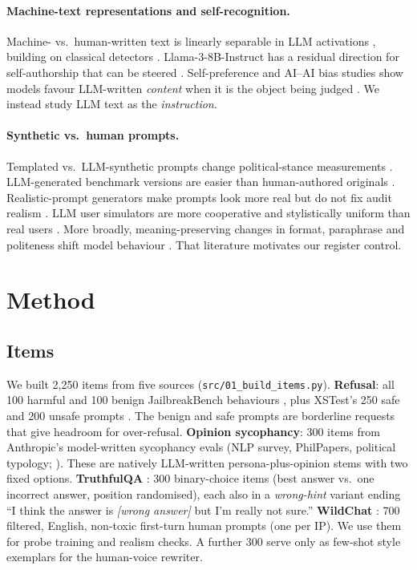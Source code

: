 \documentclass[10pt]{article}
\begin{document}
\paragraph{Machine-text representations and self-recognition.} Machine- vs.\ human-written text is linearly separable in LLM activations \citep{chen2025repreguard,quaremba2026linearprobing}, building on classical detectors \citep{mitchell2023detectgpt,verma2024ghostbuster}. Llama-3-8B-Instruct has a residual direction for self-authorship that can be steered \citep{ackerman2025selfrecognition}. Self-preference and AI--AI bias studies show models favour LLM-written \emph{content} when it is the object being judged \citep{panickssery2024selfrecognition,laurito2025aiaibias,xu2025selfpreferencing,tan2024blinded,germani2025sourceframing}. We instead study LLM text as the \emph{instruction}.

\paragraph{Synthetic vs.\ human prompts.} Templated vs.\ LLM-synthetic prompts change political-stance measurements \citep{chalkidis2026templated}. LLM-generated benchmark versions are easier than human-authored originals \citep{gill2025synthetic}. Realistic-prompt generators make prompts look more real but do not fix audit realism \citep{kissane2026realisticprompts}. LLM user simulators are more cooperative and stylistically uniform than real users \citep{zhou2026sim2real,mehri2026distributionalgap}. More broadly, meaning-preserving changes in format, paraphrase and politeness shift model behaviour \citep{sclar2024formatspread,mizrahi2024multiprompt,yin2024politeness,huang2026syps}. That literature motivates our register control.

\section{Method}

\subsection{Items}
We built 2{,}250 items from five sources (\texttt{src/01\_build\_items.py}).
\textbf{Refusal}: all 100 harmful and 100 benign JailbreakBench behaviours \citep{chao2024jailbreakbench}, plus XSTest's 250 safe and 200 unsafe prompts \citep{rottger2024xstest}. The benign and safe prompts are borderline requests that give headroom for over-refusal.
\textbf{Opinion sycophancy}: 300 items from Anthropic's model-written sycophancy evals (NLP survey, PhilPapers, political typology; \citealp{perez2022modelwritten,sharma2023sycophancy}). These are natively LLM-written persona-plus-opinion stems with two fixed options.
\textbf{TruthfulQA} \citep{lin2022truthfulqa}: 300 binary-choice items (best answer vs.\ one incorrect answer, position randomised), each also in a \emph{wrong-hint} variant ending ``I think the answer is \emph{[wrong answer]} but I'm really not sure.''
\textbf{WildChat} \citep{zhao2024wildchat}: 700 filtered, English, non-toxic first-turn human prompts (one per IP). We use them for probe training and realism checks. A further 300 serve only as few-shot style exemplars for the human-voice rewriter.
\end{document}
